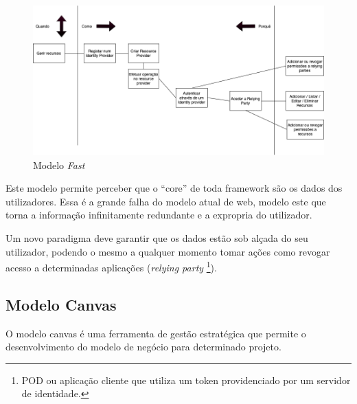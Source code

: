 \begin{figure}[h]
    \begin{center}
    \includegraphics[width=1\textwidth]{figures/Canvas-FAST.png}
    \caption{Modelo \emph{Fast}}
    \end{center}
\end{figure}

Este modelo permite perceber que o “core” de toda framework são os dados dos utilizadores. 
Essa é a grande falha do modelo atual de web, modelo este que torna a informação infinitamente redundante e a expropria do utilizador.

Um novo paradigma deve garantir que os dados estão sob alçada do seu utilizador, podendo o mesmo a qualquer momento tomar ações como revogar acesso a determinadas aplicações (\emph{relying party} \footnote{POD ou aplicação cliente que utiliza um token providenciado por um servidor de identidade.}).

\subsection{Modelo Canvas}
O modelo canvas é uma ferramenta de gestão estratégica que permite o desenvolvimento do modelo de negócio para determinado projeto.

